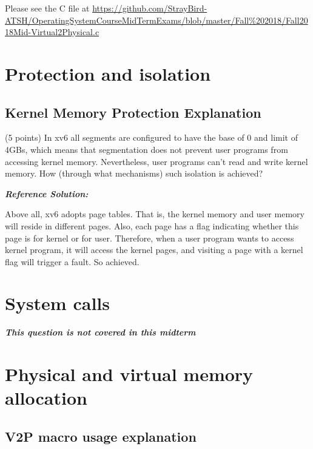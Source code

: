 \documentclass[]{article}
\begin{document}
Please see the C file at
\url{https://github.com/StrayBird-ATSH/OperatingSystemCourseMidTermExams/blob/master/Fall\%202018/Fall2018Mid-Virtual2Physical.c}

\hypertarget{protection-and-isolation}{%
\section{Protection and isolation}\label{protection-and-isolation}}

\hypertarget{kernel-memory-protection-explanation}{%
\subsection{Kernel Memory Protection
Explanation}\label{kernel-memory-protection-explanation}}

(5 points) In xv6 all segments are configured to have the base of 0 and
limit of 4GBs, which means that segmentation does not prevent user
programs from accessing kernel memory. Nevertheless, user programs can't
read and write kernel memory. How (through what mechanisms) such
isolation is achieved?

\textbf{\emph{Reference Solution:}}

Above all, xv6 adopts page tables. That is, the kernel memory and user
memory will reside in different pages. Also, each page has a flag
indicating whether this page is for kernel or for user. Therefore, when
a user program wants to access kernel program, it will access the kernel
pages, and visiting a page with a kernel flag will trigger a fault. So
achieved.

\hypertarget{system-calls}{%
\section{System calls}\label{system-calls}}

\textbf{\emph{This question is not covered in this midterm}}

\hypertarget{physical-and-virtual-memory-allocation}{%
\section{Physical and virtual memory
allocation}\label{physical-and-virtual-memory-allocation}}

\hypertarget{v2p-macro-usage-explanation}{%
\subsection{V2P macro usage
explanation}\label{v2p-macro-usage-explanation}}
\end{document}
